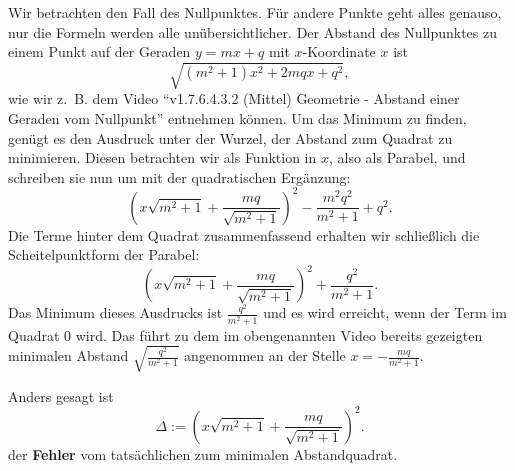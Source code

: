 \documentclass[a4paper]{amsart}
\theoremstyle{definition}
\begin{document}
Wir betrachten den Fall des Nullpunktes. Für andere Punkte geht alles genauso, nur die Formeln werden alle unübersichtlicher. Der Abstand des Nullpunktes zu einem Punkt auf der Geraden $y = mx + q$ mit $x$-Koordinate $x$ ist 
\begin{equation}
   \sqrt{(m^2+1)x^2 + 2mqx + q^2},
\end{equation}
wie wir z.~B. dem Video "`v1.7.6.4.3.2 (Mittel) Geometrie - Abstand einer Geraden vom Nullpunkt"' entnehmen können. Um das Minimum zu finden, genügt es den Ausdruck unter der Wurzel, der Abstand zum Quadrat zu minimieren.
Diesen betrachten wir als Funktion in $x$, also als Parabel, und schreiben sie nun um mit der quadratischen Ergänzung:
\begin{equation}
   \left( x \sqrt{m^2+1} + \frac{mq}{\sqrt{m^2+1}} \right)^2 - \frac{m^2q^2}{m^2+1} + q^2.
\end{equation}
Die Terme hinter dem Quadrat zusammenfassend erhalten wir schließlich die Scheitelpunktform der Parabel:
\begin{equation}
   \boxed{
      \left( x \sqrt{m^2+1} + \frac{mq}{\sqrt{m^2+1}} \right)^2 + \frac{q^2}{m^2+1}.
   }
\end{equation}
Das Minimum dieses Ausdrucks ist $\frac{q^2}{m^2+1}$ und es wird erreicht, wenn der Term im Quadrat $0$ wird. Das führt zu dem im obengenannten Video bereits gezeigten minimalen Abstand $\sqrt{\frac{q^2}{m^2+1}}$ angenommen an der Stelle $x = -\frac{mq}{m^2+1}$.

Anders gesagt ist
\begin{equation}
   \boxed{
      \Delta := \left( x \sqrt{m^2+1} + \frac{mq}{\sqrt{m^2+1}} \right)^2 .
   }
\end{equation}
der \textbf{Fehler} vom tatsächlichen zum minimalen Abstandquadrat.
\end{document}
